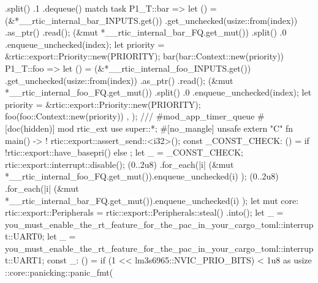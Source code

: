 {{{                    .split()
                    .1
                    .dequeue()
                {
                    match task {
                        P1_T::bar => {
                            let () = (&*__rtic_internal_bar_INPUTS.get())
                                .get_unchecked(usize::from(index))
                                .as_ptr()
                                .read();
                            (&mut *__rtic_internal_bar_FQ.get_mut())
                                .split()
                                .0
                                .enqueue_unchecked(index);
                            let priority = &rtic::export::Priority::new(PRIORITY);
                            bar(bar::Context::new(priority))
                        }
                        P1_T::foo => {
                            let () = (&*__rtic_internal_foo_INPUTS.get())
                                .get_unchecked(usize::from(index))
                                .as_ptr()
                                .read();
                            (&mut *__rtic_internal_foo_FQ.get_mut())
                                .split()
                                .0
                                .enqueue_unchecked(index);
                            let priority = &rtic::export::Priority::new(PRIORITY);
                            foo(foo::Context::new(priority))
                        }
                    }
                }
            },
        );
    }
    /// #mod_app_timer_queue
    #[doc(hidden)]
    mod rtic_ext {
        use super::*;
        #[no_mangle]
        unsafe extern "C" fn main() -> ! {
            rtic::export::assert_send::<i32>();
            const _CONST_CHECK: () = { if !rtic::export::have_basepri() {} else {} };
            let _ = _CONST_CHECK;
            rtic::export::interrupt::disable();
            (0..2u8)
                .for_each(|i| {
                    (&mut *__rtic_internal_foo_FQ.get_mut()).enqueue_unchecked(i)
                });
            (0..2u8)
                .for_each(|i| {
                    (&mut *__rtic_internal_bar_FQ.get_mut()).enqueue_unchecked(i)
                });
            let mut core: rtic::export::Peripherals = rtic::export::Peripherals::steal()
                .into();
            let _ = you_must_enable_the_rt_feature_for_the_pac_in_your_cargo_toml::interrupt::UART0;
            let _ = you_must_enable_the_rt_feature_for_the_pac_in_your_cargo_toml::interrupt::UART1;
            const _: () = if (1 << lm3s6965::NVIC_PRIO_BITS) < 1u8 as usize {
                {
                    ::core::panicking::panic_fmt(
}}}}}
